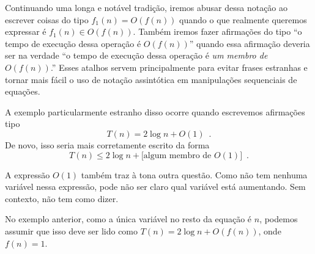 Continuando uma longa e notável tradição, iremos abusar dessa notação 
ao escrever 
coisas do tipo $f_1(n) = O(f(n))$ quando o que realmente queremos
expressar é $f_1(n) \in O(f(n))$.  
Também iremos fazer afirmações do tipo ``o tempo de execução dessa operação 
é $O(f(n))$'' quando essa afirmação deveria ser na verdade 
``o tempo de execução dessa operação é \emph{um membro de} $O(f(n))$.''
Esses atalhos servem principalmente para evitar frases estranhas e tornar 
mais fácil o uso de notação assintótica em manipulações sequenciais de equações.

A exemplo particularmente estranho disso ocorre quando escrevemos afirmações tipo
\[
  T(n) = 2\log n + O(1)  \enspace .
\]
De novo, isso seria mais corretamente escrito da forma
\[
  T(n) \le 2\log n + [\mbox{algum membro de $O(1)$]}  \enspace .
\]

A expressão $O(1)$ também traz à tona outra questão. 
Como não tem nenhuma variável nessa expressão, pode não ser claro qual variável está aumentando. Sem contexto, não tem como dizer.

No exemplo anterior, como a única variável no resto da equação é $n$, podemos assumir que isso deve ser lido como $T(n)=2\log n+O(f(n))$, onde $f(n) = 1$.

